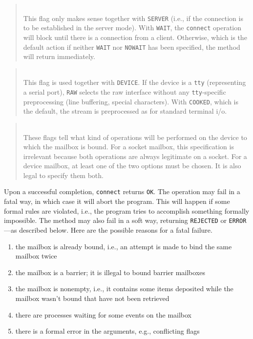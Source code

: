 \begin{quote}
\noindent{}\\ \hspace{0in}
This flag only makes sense together with {\tt SERVER} (i.e., if the
connection is to be established in the server mode).
With {\tt WAIT}, the {\tt connect} operation will block until there is
a connection from a client.
Otherwise, which is the default action if neither
{\tt WAIT} nor {\tt NOWAIT} has been specified,
the method will return immediately.
\end{quote}

\begin{quote}
\noindent{}\\ \hspace{0in}
This flag is used together with {\tt DEVICE}.
If the device is a {\tt tty} (representing a serial port), {\tt RAW}
selects the raw interface without any {\tt tty}-specific preprocessing
(line buffering, special characters).
With {\tt COOKED}, which is the default, the stream is preprocessed
as for standard terminal i/o.
\end{quote}

\begin{quote}
\noindent{}\\ \hspace{0in}
These flags tell what kind of operations will be performed on the
device to which the mailbox is bound.
For a socket mailbox, this specification is irrelevant because both
operations are always legitimate on a socket.
For a device mailbox, at least one of the two options must be chosen.
It is also legal to specify them both.
\end{quote}

Upon a successful completion, {\tt connect} returns {\tt OK}.
The operation may fail in a fatal way, in which case it will abort the program.
This will happen if some formal rules are violated, i.e., the program tries
to accomplish something formally impossible.
The method may also fail in a soft way, returning {\tt REJECTED} or
{\tt ERROR}---as described below.
Here are the possible reasons for a fatal failure.

\begin{enumerate}
\item
the mailbox is already bound, i.e., an attempt is made
to bind the same mailbox twice
\item
the mailbox is a barrier; it is illegal to bound barrier mailboxes
\item
the mailbox is nonempty, i.e., it contains some items deposited
while the mailbox wasn't bound that have not been retrieved
\item
there are processes waiting for some events on the mailbox
\item
there is a formal error in the arguments, e.g., conflicting flags
\end{enumerate}

